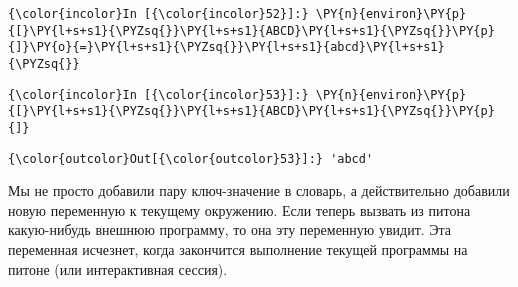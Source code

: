     \begin{Verbatim}[commandchars=\\\{\}]
{\color{incolor}In [{\color{incolor}52}]:} \PY{n}{environ}\PY{p}{[}\PY{l+s+s1}{\PYZsq{}}\PY{l+s+s1}{ABCD}\PY{l+s+s1}{\PYZsq{}}\PY{p}{]}\PY{o}{=}\PY{l+s+s1}{\PYZsq{}}\PY{l+s+s1}{abcd}\PY{l+s+s1}{\PYZsq{}}
\end{Verbatim}

    \begin{Verbatim}[commandchars=\\\{\}]
{\color{incolor}In [{\color{incolor}53}]:} \PY{n}{environ}\PY{p}{[}\PY{l+s+s1}{\PYZsq{}}\PY{l+s+s1}{ABCD}\PY{l+s+s1}{\PYZsq{}}\PY{p}{]}
\end{Verbatim}

            \begin{Verbatim}[commandchars=\\\{\}]
{\color{outcolor}Out[{\color{outcolor}53}]:} 'abcd'
\end{Verbatim}
        
    Мы не просто добавили пару ключ-значение в словарь, а действительно
добавили новую переменную к текущему окружению. Если теперь вызвать из
питона какую-нибудь внешнюю программу, то она эту переменную увидит. Эта
переменная исчезнет, когда закончится выполнение текущей программы на
питоне (или интерактивная сессия).
